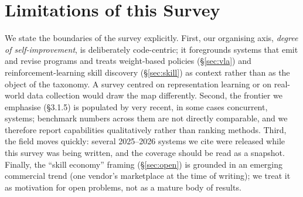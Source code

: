 \section{Limitations of this Survey}
\label{sec:limitations}

We state the boundaries of the survey explicitly. First, our organising axis, \emph{degree
of self-improvement}, is deliberately code-centric; it foregrounds systems that emit and
revise programs and treats weight-based policies (\S\ref{sec:vla}) and reinforcement-learning
skill discovery (\S\ref{sec:skill}) as context rather than as the object of the taxonomy.
A survey centred on representation learning or on real-world data collection would draw the
map differently. Second, the frontier we emphasise (\S3.1.5) is populated by very recent,
in some cases concurrent, systems; benchmark numbers across them are not directly
comparable, and we therefore report capabilities qualitatively rather than ranking methods.
Third, the field moves quickly: several 2025--2026 systems we cite were released while this
survey was being written, and the coverage should be read as a snapshot. Finally, the
``skill economy'' framing (\S\ref{sec:open}) is grounded in an emerging commercial trend
(one vendor's marketplace at the time of writing); we treat it as motivation for open
problems, not as a mature body of results.
